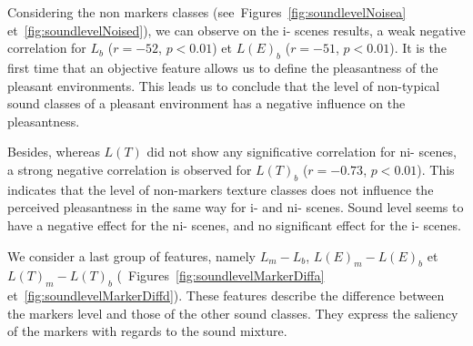 \documentclass[twoside,twocolumn]{article}
\begin{document}
Considering the non markers classes (see~Figures~\ref{fig:soundlevelNoisea} et~\ref{fig:soundlevelNoised}), we can observe on the i- scenes results, a weak negative correlation for $L_b$  ($r=-52$, $p<0.01$) et $L(E)_b$ ($r=-51$, $p<0.01$). It is the first time that an objective feature allows us to define the pleasantness of the pleasant environments. This leads us to conclude that the level of non-typical sound classes of a pleasant environment has a negative influence on the pleasantness.


Besides, whereas $L(T)$ did not show any significative correlation for ni- scenes, a strong negative correlation is observed for $L(T)_b$ ($r = -0.73$, $p < 0.01$). This indicates that the level of non-markers texture classes does not influence the perceived pleasantness in the same way for i- and ni- scenes. Sound level seems to have a negative effect for the ni- scenes, and no significant effect for the i- scenes.


We consider a last group of features, namely $L_m-L_b$, $L(E)_m-L(E)_b$ et $L(T)_m-L(T)_b$ (\cf~Figures~\ref{fig:soundlevelMarkerDiffa} et~\ref{fig:soundlevelMarkerDiffd}).  These features describe the difference between the markers level and those of the other sound classes. They express the saliency of the markers with regards to the sound mixture.

\end{document}
